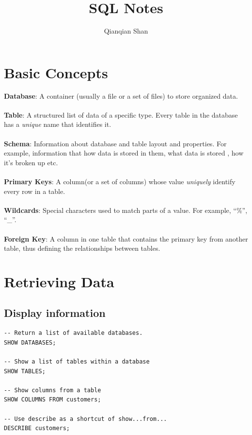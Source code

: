\documentclass[12pt,oneside,a4paper]{article}
\author{Qianqian Shan}
\title{SQL Notes}
\date{\vspace{-5ex}}
\begin{document}
\maketitle
\tableofcontents
\newpage



\lstset{escapechar=none,style=customc}

\lstset{language=SQL}          %
\section{Basic Concepts}
\textbf{Database}: A container (usually a file or a set of files) to store organized data. 
\\~\\
\textbf{Table}: A structured list of data of a specific type. Every table in the database has a \emph{unique} name that identifies it. 
\\~\\
\textbf{Schema}: Information about database and table layout and properties. For example, information that how data is stored in them, what data is stored , how it's broken up etc. 
\\~\\
\textbf{Primary Keys}: A column(or a set of columns) whose value \emph{uniquely} identify every row in a table. \\~\\
\textbf{Wildcards}: Special characters used to match parts of a value. For example, ``\%'', ``\_''.\\~\\
\textbf{Foreign Key}: A column in one table that contains the primary key from another table, thus defining the relationships between tables. 

\section{Retrieving Data}
\subsection{Display information}
\begin{lstlisting}
-- Return a list of available databases.
SHOW DATABASES; 

-- Show a list of tables within a database 
SHOW TABLES;

-- Show columns from a table 
SHOW COLUMNS FROM customers;

-- Use describe as a shortcut of show...from...
DESCRIBE customers;

\end{lstlisting}
\end{document}
